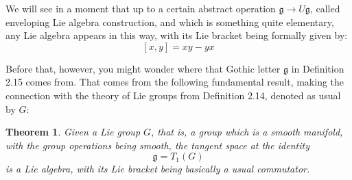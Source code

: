 \documentclass[12pt]{amsbook}
\newtheorem{theorem}{Theorem}[chapter]
\begin{document}
We will see in a moment that up to a certain abstract operation $\mathfrak g\to U\mathfrak g$, called enveloping Lie algebra construction, and which is something quite elementary, any Lie algebra appears in this way, with its Lie bracket being formally given by:
$$[x,y]=xy-yx$$

Before that, however, you might wonder where that Gothic letter $\mathfrak g$ in Definition 2.15 comes from. That comes from the following fundamental result, making the connection with the theory of Lie groups from Definition 2.14, denoted as usual by $G$:

\begin{theorem}
Given a Lie group $G$, that is, a group which is a smooth manifold, with the group operations being smooth, the tangent space at the identity
$$\mathfrak g=T_1(G)$$
is a Lie algebra, with its Lie bracket being basically a usual commutator.
\end{theorem}
\end{document}
